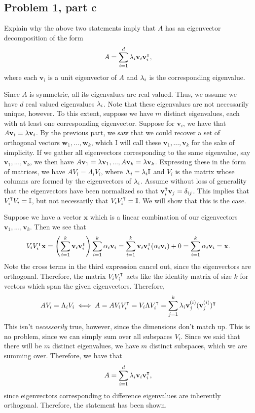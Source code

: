 \subsection{Problem 1, part c}
Explain why the above two statements imply that $A$ has an eigenvector decomposition of the form 
\[A = \sum_{i = 1}^d \mathrm{\lambda}_i \textbf{v}_i \textbf{v}_i^{\intercal},\]
where each $\textbf{v}_i$ is a unit eigenvector of $A$ and $\mathrm{\lambda}_i$ is the corresponding eigenvalue.
\partbreak
\begin{solution}
    
    Since $A$ is symmetric, all its eigenvalues are real valued. Thus, we assume we have $d$ real valued eigenvalues $\mathrm{\lambda}_i$. Note that these eigenvalues are not necessarily unique, however. To this extent, suppose we have $m$ distinct eigenvalues, each with at least one corresponding eigenvector. Suppose for $\textbf{v}_i$, we have that $A\textbf{v}_i = \mathrm{\lambda} \textbf{v}_i$. By the previous part, we saw that we could recover a set of orthogonal vectors $\textbf{w}_1, ..., \textbf{w}_k$, which I will call these $\textbf{v}_1, ..., \textbf{v}_k$ for the sake of simplicity. If we gather all eigenvectors corresponding to the same eigenvalue, say $\textbf{v}_1, ..., \textbf{v}_k$, we then have $A\textbf{v}_1 = \mathrm{\lambda}\textbf{v}_1, ..., A\textbf{v}_k = \mathrm{\lambda} \textbf{v}_k$.  Expressing these in the form of matrices, we have $AV_i = \Lambda_i V_i$, where $\Lambda_i = \mathrm{\lambda}_i\mathbb{I}$ and $V_i$ is the matrix whose columns are formed by the eigenvectors of $\mathrm{\lambda}_i$. Assume without loss of generality that the eigenvectors have been normalized so that $\textbf{v}_i^{\intercal} \textbf{v}_j = \delta_{ij}$. This implies that $V_i^{\intercal} V_i = \mathbb{I}$, but not necessarily that $V_iV_i^{\intercal} = \mathbb{I}$. We will show that this is the case.

    \jump
    Suppose we have a vector $\textbf{x}$ which is a linear combination of our eigenvectors $\textbf{v}_1, ..., \textbf{v}_k$. Then we see that 
    \[V_iV_i^{\intercal} \textbf{x}= \left(\sum_{i = 1}^k \textbf{v}_i\textbf{v}_i^{\intercal} \right)\sum_{i = 1}^k \alpha_i\textbf{v}_i = \sum_{i = 1}^k \textbf{v}_i\textbf{v}_i^{\intercal} (\alpha_i \textbf{v}_i) + 0 = \sum_{i = 1}^k \alpha_i \textbf{v}_i = \textbf{x}.\]
    Note the cross terms in the third expression cancel out, since the eigenvectors are orthogonal. Therefore, the matrix $V_iV_i^{\intercal}$ acts like the identity matrix of size $k$ for vectors which span the given eigenvectors. Therefore, 
    \[AV_i = \Lambda_i V_i \iff A = AV_iV_i^{\intercal} = V_i\Lambda V_i^{\intercal} = \sum_{j = 1}^k \mathrm{\lambda}_i \textbf{v}_j^{(i)} (\textbf{v}_j^{(i)})^{\intercal}\]
    This isn't \textit{necessarily} true, however, since the dimensions don't match up. This is no problem, since we can simply sum over all subspaces $V_i$. Since we said that there will be $m$ distinct eigenvalues, we have $m$ distinct subspaces, which we are summing over. Therefore, we have that 
    \[A = \sum_{i = 1}^d \mathrm{\lambda}_i \textbf{v}_i \textbf{v}_i^{\intercal},\]
    since eigenvectors corresponding to difference eigenvalues are inherently orthogonal. Therefore, the statement has been shown. 
    
\end{solution}

